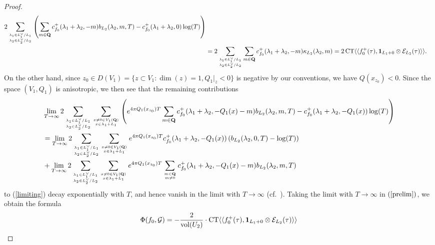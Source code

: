\documentclass{amsart}
\theoremstyle{definition}
\begin{document}
\begin{proof}
\begin{align*}
2 \sum\limits_{ \lambda_1 \in L_1^{\vee} / L_1 \atop \lambda_2 \in L_2^{\vee}/L_2  } 
\left( \sum\limits_{m \in {\bf{Q}} } c_{f_0}^+(\lambda_1+ \lambda_2, - m) b_{L_2}(\lambda_2, m, T)  -   c_{f_0}^+(\lambda_1 + \lambda_2, 0)  \log(T)    \right)  \\
&= 2 \sum\limits_{ \lambda_1 \in L_1^{\vee} / L_1 \atop \lambda_2 \in L_2^{\vee}/L_2  } 
\sum\limits_{m \in {\bf{Q}} } c_{f_0}^+(\lambda_1+\lambda_2, -m) \kappa_{L_2}(\lambda_2, m)
= 2 \operatorname{CT} \langle \langle f_0^+(\tau), {\bf{1}}_{L_1 + 0} \otimes \mathcal{E}_{L_2}(\tau) \rangle \rangle. \end{align*}
On the other hand, since $z_0 \in D(V_1)=\lbrace z \subset V_1: \dim(z) = 1, Q_1\vert_z < 0 \rbrace$ is negative by our conventions, 
we have $Q(x_{z_0}) <0$. Since the space $(V_1, Q_1)$ is anisotropic, we then see that the remaining contributions 
\begin{equation*}\begin{aligned} &\lim_{T \rightarrow \infty} 
2 \sum\limits_{ \lambda_1 \in L_1^{\vee} / L_1 \atop \lambda_2 \in L_2^{\vee}/L_2  } \sum\limits_{x  \neq 0 \in V_1({\bf{Q}}) \atop x \in \lambda_1 + L_1} 
\left( e^{4 \pi Q_1(x_{z_0}) T} \sum\limits_{m \in {\bf{Q}} } c_{f_0}^+(\lambda_1+ \lambda_2, -Q_1(x) - m) b_{L_2}(\lambda_2, m, T)  -   c_{f_0}^+(\lambda_1 + \lambda_2, -Q_1(x))  \log(T)    \right)  \\
&= \lim_{T \rightarrow \infty } 2 \sum\limits_{ \lambda_1 \in L_1^{\vee} / L_1 \atop \lambda_2 \in L_2^{\vee}/L_2  } 
\sum\limits_{x  \neq 0 \in V_1({\bf{Q}}) \atop x \in \lambda_1 + L_1} 
e^{4 \pi Q_1(x_{z_0}) T}  c_{f_0}^+(\lambda_1 + \lambda_2, -Q_1(x)) \left( b_{L_2}(\lambda_2, 0, T) - \log(T) \right)  \\ 
&+  \lim_{T \rightarrow \infty} 2 \sum\limits_{ \lambda_1 \in L_1^{\vee} / L_1 \atop \lambda_2 \in L_2^{\vee}/L_2  } 
\sum\limits_{x  \neq 0 \in V_1({\bf{Q}}) \atop x \in \lambda_1 + L_1}  e^{4 \pi Q_1(x_{z_0}) T} 
\sum\limits_{m \in {\bf{Q}} \atop m \neq 0 } c_{f_0}^+(\lambda_1+ \lambda_2, -Q_1(x) - m) b_{L_2}(\lambda_2, m, T) \end{aligned}\end{equation*}
to (\ref{limiting}) decay exponentially with $T$, and hence vanish in the limit with $T \rightarrow \infty$ (cf.~\cite[Proposition 2.11]{KuBL}). 
Taking the limit with $T \rightarrow \infty$ in $(\ref{prelim})$, we obtain the formula
\begin{equation*}\begin{aligned} \Phi( f_0, \mathcal{G})
&= -  \frac{2}{\operatorname{vol}(U_2)} \cdot \operatorname{CT} \langle \langle f_0^+(\tau), {\bf{1}}_{L_1 + 0} \otimes \mathcal{E}_{L_2}(\tau) \rangle \rangle \\

\end{aligned}
\end{equation*}
\end{proof}
\end{document}
